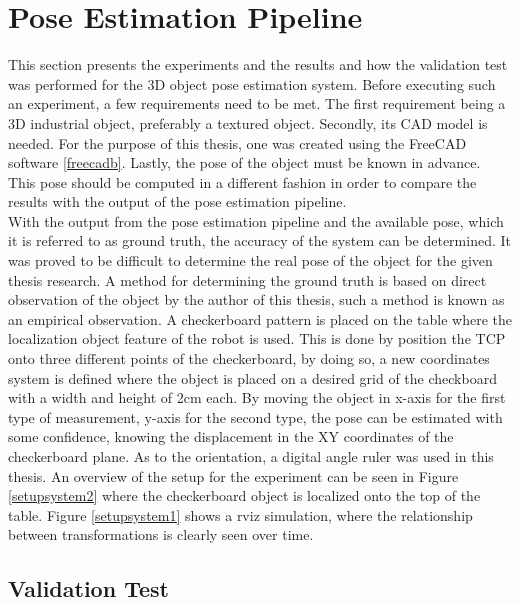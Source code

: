 \section{Pose Estimation Pipeline}

This section presents the experiments and the results and how the validation test was performed for the 3D object pose estimation system. Before executing such an experiment, a few requirements need to be met. The first requirement being a 3D industrial object, preferably a textured object. Secondly, its CAD model is needed. For the purpose of this thesis, one was created using the FreeCAD software \ref{freecadb}. Lastly, the pose of the object must be known in advance. This pose should be computed in a different fashion in order to compare the results with the output of the pose estimation pipeline.\\
With the output from the pose estimation pipeline and the available pose, which it is referred to as ground truth, the accuracy of the system can be determined. It was proved to be difficult to determine the real pose of the object for the given thesis research. A method for determining the ground truth is based on direct observation of the object by the author of this thesis, such a method is known as an empirical observation. A checkerboard pattern is placed on the table where the localization object feature of the robot is used. This is done by position the TCP onto three different points of the checkerboard, by doing so, a new coordinates system is defined where the object is placed on a desired grid of the checkboard with a width and height of 2cm each. By moving the object in x-axis for the first type of measurement, y-axis for the second type, the pose can be estimated with some confidence, knowing the displacement in the XY coordinates of  the checkerboard plane. As to the orientation, a digital angle ruler was used in this thesis. An overview of the setup for the experiment can be seen in Figure \ref{setupsystem2} where the checkerboard object is localized onto the top of the table. Figure \ref{setupsystem1} shows a rviz simulation, where the relationship between transformations is clearly seen over time. 

\subsection{Validation Test}\label{valitest}

